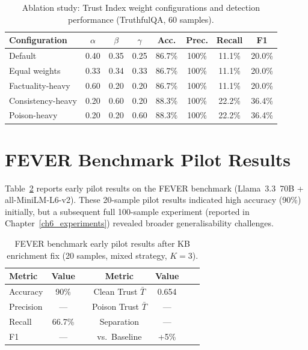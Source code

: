 \begin{table}[h]
\centering
\caption{Ablation study: Trust Index weight configurations and detection performance (TruthfulQA, 60 samples).}
\label{tab:app_ablation}
\begin{tabular}{lccccccc}
\hline
\textbf{Configuration} & $\alpha$ & $\beta$ & $\gamma$ & \textbf{Acc.} & \textbf{Prec.} & \textbf{Recall} & \textbf{F1} \\
\hline
Default             & 0.40 & 0.35 & 0.25 & 86.7\% & 100\% & 11.1\% & 20.0\% \\
Equal weights       & 0.33 & 0.34 & 0.33 & 86.7\% & 100\% & 11.1\% & 20.0\% \\
Factuality-heavy    & 0.60 & 0.20 & 0.20 & 86.7\% & 100\% & 11.1\% & 20.0\% \\
Consistency-heavy   & 0.20 & 0.60 & 0.20 & 88.3\% & 100\% & 22.2\% & 36.4\% \\
Poison-heavy        & 0.20 & 0.20 & 0.60 & 88.3\% & 100\% & 22.2\% & 36.4\% \\
\hline
\end{tabular}
\end{table}

\section{FEVER Benchmark Pilot Results}

Table~\ref{tab:app_fever} reports early pilot results on the FEVER benchmark (Llama~3.3~70B + all-MiniLM-L6-v2). These 20-sample pilot results indicated high accuracy (90\%) initially, but a subsequent full 100-sample experiment (reported in Chapter~\ref{ch6_experiments}) revealed broader generalisability challenges.

\begin{table}[h]
\centering
\caption{FEVER benchmark early pilot results after KB enrichment fix (20 samples, mixed strategy, $K=3$).}
\label{tab:app_fever}
\begin{tabular}{lcccccc}
\hline
\textbf{Metric} & \textbf{Value} & \quad & \textbf{Metric} & \textbf{Value} \\
\hline
Accuracy        & 90\%   & & Clean Trust $\bar{T}$ & 0.654 \\
Precision       & ---    & & Poison Trust $\bar{T}$ & --- \\
Recall          & 66.7\% & & Separation    & --- \\
F1              & ---    & & vs.\ Baseline & +5\% \\
\hline
\end{tabular}
\end{table}
